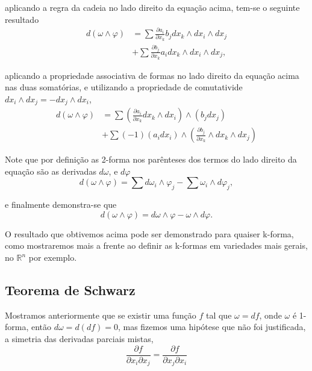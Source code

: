 aplicando a regra da cadeia no lado direito da equação acima, tem-se o seguinte resultado
%
\begin{align}
\nonumber d(\omega \wedge \varphi) &= \sum \frac{\partial a_i}{\partial x_k} b_j dx_k \wedge dx_i \wedge dx_j 
\\
&+ \sum \frac{\partial b_j}{\partial x_k} a_i dx_k \wedge dx_i \wedge dx_j,
\end{align}

aplicando a propriedade associativa de formas no lado direito da equação acima nas duas somatórias, e utilizando a propriedade de comutativide $dx_i \wedge dx_j = - dx_j \wedge dx_i$,
%
\begin{align}
\nonumber d(\omega \wedge \varphi) &= \sum \left(\frac{\partial a_i}{\partial x_k} dx_k \wedge dx_i\right)  \wedge (b_j dx_j) 
\\
&+ \sum (-1)(a_i dx_i) \wedge \left(\frac{\partial b_j}{\partial x_k} \wedge dx_k \wedge dx_j\right)
\end{align}

Note que por definição as 2-forma nos parênteses dos termos do lado direito da equação são as derivadas $d\omega$, e $d\varphi$
%
\begin{equation}
d(\omega \wedge \varphi) = \sum d\omega_i \wedge \varphi_j
- \sum \omega_i \wedge d\varphi_j,
\end{equation}

e finalmente demonstra-se que 
%
\begin{equation}
d(\omega \wedge \varphi) = d\omega \wedge \varphi - \omega \wedge d\varphi. 
\end{equation}

O resultado que obtivemos acima pode ser demonstrado para quaiser k-forma, como mostraremos mais a frente ao definir as k-formas em variedades mais gerais, no $\mathbb{R}^n$ por exemplo.



\subsection{Teorema de Schwarz} 

Mostramos anteriormente que se existir uma função $f$ tal que 
$\omega = df$, onde $\omega$ é 1-forma, então $d\omega = d(df) = 0$, mas fizemos uma hipótese que não foi justificada, a simetria das derivadas parciais mistas, 
%
\begin{equation}
\frac{\partial f}{\partial x_i \partial x_j} 
= \frac{\partial f}{\partial x_j \partial x_i}
\end{equation}

